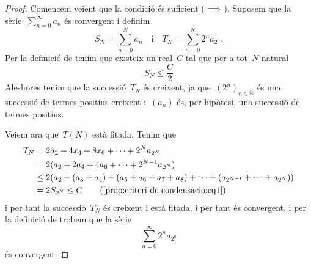 \documentclass[../../main.tex]{subfiles}
\begin{document}
    \begin{proof}
        Comencem veient que la condició és suficient (\(\implies\)).
        Suposem que la sèrie~\(\sum_{n=0}^{\infty}a_{n}\) és convergent i definim
        \[
            S_{N}=\sum_{n=0}^{N}a_{n}\quad\text{i}\quad T_{N}=\sum_{n=0}^{N}2^{n}a_{2^{n}}.
        \]
        Per la definició de  tenim que existeix un real~\(C\) tal que per a tot~\(N\) natural
        \begin{equation}
            \label{prop:criteri-de-condensacio:eq1}
            S_{N}\leq\frac{C}{2}
        \end{equation}
        Aleshores tenim que la successió~\(T_{N}\) és creixent, ja que~\((2^{n})_{n\in\mathbb{N}}\) és una successió de termes positius creixent i~\((a_{n})\) és, per hipòtesi, una successió de termes positius.

        Veiem ara que~\(T(N)\) està fitada.
        Tenim que
        \begin{align*}
            T_{N}&=2a_{2}+4x_{4}+8x_{6}+\dots+2^{N}a_{2^{N}} \\
            &=2(a_{2}+2a_{4}+4a_{6}+\dots+2^{N-1}a_{2^{N}}) \\
            &\leq2\left(a_{2}+(a_{3}+a_{4})+(a_{5}+a_{6}+a_{7}+a_{8})+\dots+(a_{2^{N-1}}+\dots+a_{2^{N}})\right) \\
            &=2S_{2^{N}}\leq C \tag{\ref{prop:criteri-de-condensacio:eq1}}
        \end{align*}
        i per tant la successió~\(T_{N}\) és creixent i està fitada, i per tant és convergent, i per la definició de  trobem que la sèrie
        \[
            \sum_{n=0}^{\infty}2^{n}a_{2^{n}}
        \]
        és convergent.


\end{proof}
\end{document}
